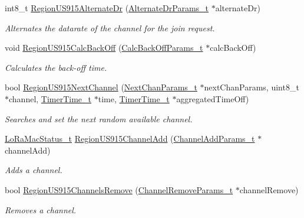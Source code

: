 \begin{DoxyCompactItemize}
int8\+\_\+t \hyperlink{group__REGIONUS915_ga9e5ef150c6e3edd0670bef1f4cf99357}{Region\+U\+S915\+Alternate\+Dr} (\hyperlink{group__REGION_ga001ea4338d1c83f4c785b49d7ad2d696}{Alternate\+Dr\+Params\+\_\+t} $\ast$alternate\+Dr)
\begin{DoxyCompactList}\small\item\em Alternates the datarate of the channel for the join request. \end{DoxyCompactList}\item 
void \hyperlink{group__REGIONUS915_ga134edad7c2c6d4c2a063b08b6358b8be}{Region\+U\+S915\+Calc\+Back\+Off} (\hyperlink{group__REGION_ga7c5c9a8da174e6679eded8257dc92fd9}{Calc\+Back\+Off\+Params\+\_\+t} $\ast$calc\+Back\+Off)
\begin{DoxyCompactList}\small\item\em Calculates the back-\/off time. \end{DoxyCompactList}\item 
bool \hyperlink{group__REGIONUS915_gad71779a9d5d5313772465332221e9287}{Region\+U\+S915\+Next\+Channel} (\hyperlink{group__REGION_ga115f5e83afae352c0a3dcdc193374040}{Next\+Chan\+Params\+\_\+t} $\ast$next\+Chan\+Params, uint8\+\_\+t $\ast$channel, \hyperlink{utilities_8h_a4215ca43d3e953099ea758ce428599d0}{Timer\+Time\+\_\+t} $\ast$time, \hyperlink{utilities_8h_a4215ca43d3e953099ea758ce428599d0}{Timer\+Time\+\_\+t} $\ast$aggregated\+Time\+Off)
\begin{DoxyCompactList}\small\item\em Searches and set the next random available channel. \end{DoxyCompactList}\item 
\hyperlink{group__LORAMAC_ga30bd25657e10480f8605ee951b0ecfbd}{Lo\+Ra\+Mac\+Status\+\_\+t} \hyperlink{group__REGIONUS915_gad085905909fed76b2b7355aa2e22e1f7}{Region\+U\+S915\+Channel\+Add} (\hyperlink{group__REGION_gab1c5f3aa06614283202906cef4417860}{Channel\+Add\+Params\+\_\+t} $\ast$channel\+Add)
\begin{DoxyCompactList}\small\item\em Adds a channel. \end{DoxyCompactList}\item 
bool \hyperlink{group__REGIONUS915_gace049f46aefc7abb2152b6013ad5c0a6}{Region\+U\+S915\+Channels\+Remove} (\hyperlink{group__REGION_gaa37468560d2fc81a977b57a48e5d72c0}{Channel\+Remove\+Params\+\_\+t} $\ast$channel\+Remove)
\begin{DoxyCompactList}\small\item\em Removes a channel. \end{DoxyCompactList}\item 

\end{DoxyCompactItemize}
